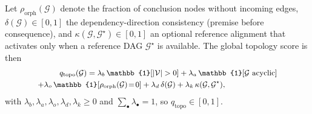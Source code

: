 

Let $\rho_{\mathrm{orph}}(\mathcal{G})$ denote the fraction of conclusion nodes without incoming edges, $\delta(\mathcal{G})\!\in\![0,1]$ the dependency-direction consistency (premise before consequence), and $\kappa(\mathcal{G},\mathcal{G}^{\star})\!\in\![0,1]$ an optional reference alignment that activates only when a reference DAG $\mathcal{G}^{\star}$ is available. The global topology score is then
\begin{equation}
\label{eq:qtopo}
\small
\begin{aligned}
q_{\mathrm{topo}}(\mathcal{G})=\;
& \lambda_b\,\mathbb{1}[|\mathcal{V}|>0]
+\lambda_a\,\mathbb{1}[\mathcal{G}\text{ acyclic}] \\
+\lambda_o\,\mathbb{1}&[\rho_{\mathrm{orph}}(\mathcal{G})\!=\!0]
+\lambda_d\,\delta(\mathcal{G})
+\lambda_k\,\kappa(\mathcal{G},\mathcal{G}^{\star}),
\end{aligned} %
\end{equation}
with $\lambda_b,\lambda_a,\lambda_o,\lambda_d,\lambda_k\!\ge\!0$ and $\sum_\bullet\lambda_\bullet\!=\!1$, so $q_{\mathrm{topo}}\!\in\![0,1]$.

